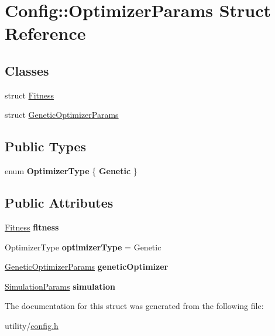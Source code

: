 \hypertarget{struct_config_1_1_optimizer_params}{}\section{Config\+:\+:Optimizer\+Params Struct Reference}
\label{struct_config_1_1_optimizer_params}
\subsection*{Classes}
\begin{DoxyCompactItemize}
\item 
struct \hyperlink{struct_config_1_1_optimizer_params_1_1_fitness}{Fitness}
\item 
struct \hyperlink{struct_config_1_1_optimizer_params_1_1_genetic_optimizer_params}{Genetic\+Optimizer\+Params}
\end{DoxyCompactItemize}
\subsection*{Public Types}
\begin{DoxyCompactItemize}
\item 
\mbox{\label{struct_config_1_1_optimizer_params_a5af58e4f3cf954086eaf5e8b43412a23}} 
enum {\bfseries Optimizer\+Type} \{ {\bfseries Genetic}
 \}
\end{DoxyCompactItemize}
\subsection*{Public Attributes}
\begin{DoxyCompactItemize}
\item 
\mbox{\label{struct_config_1_1_optimizer_params_a556b51c730b3f5b3640de00247cb9148}} 
\hyperlink{struct_config_1_1_optimizer_params_1_1_fitness}{Fitness} {\bfseries fitness}
\item 
\mbox{\label{struct_config_1_1_optimizer_params_a3f676c6d7b5e15253620c16859663b2c}} 
Optimizer\+Type {\bfseries optimizer\+Type} = Genetic
\item 
\mbox{\label{struct_config_1_1_optimizer_params_a76fac8f9bcac64ee0a1694faec04d084}} 
\hyperlink{struct_config_1_1_optimizer_params_1_1_genetic_optimizer_params}{Genetic\+Optimizer\+Params} {\bfseries genetic\+Optimizer}
\item 
\mbox{\label{struct_config_1_1_optimizer_params_a9d96a4d78bec250c3742eb5dc3ada304}} 
\hyperlink{struct_config_1_1_simulation_params}{Simulation\+Params} {\bfseries simulation}
\end{DoxyCompactItemize}


The documentation for this struct was generated from the following file\+:\begin{DoxyCompactItemize}
\item 
utility/\hyperlink{config_8h}{config.\+h}\end{DoxyCompactItemize}
